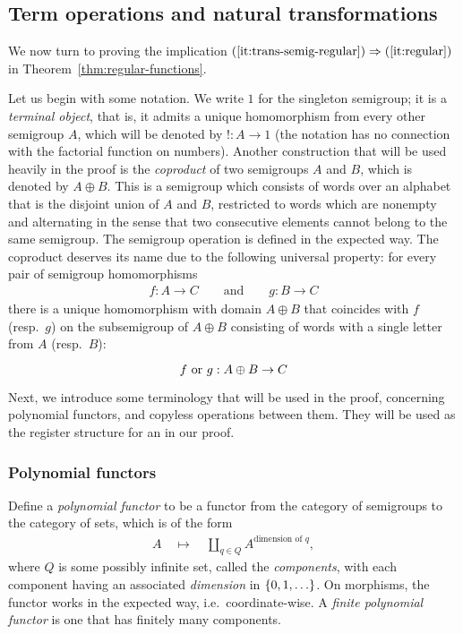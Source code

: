 

\subsection{Term operations and natural transformations}
We now turn to proving the implication $(\ref{it:trans-semig-regular}) \Rightarrow (\ref{it:regular})$ in Theorem~\ref{thm:regular-functions}.

Let us begin with some notation. We write $1$ for the singleton semigroup; it is a \emph{terminal object}, that is, it admits a unique homomorphism from every other semigroup $A$, which will be denoted by $! : A \to 1$ (the notation has no connection with the factorial function on numbers). Another construction that will be used heavily in the proof is the \emph{coproduct} of two semigroups $A$ and $B$, which is denoted by $A \oplus B$. This is a semigroup which consists of words over an alphabet that is the disjoint union of $A$ and $B$, restricted to words which are nonempty and alternating in the sense that two consecutive elements cannot belong to the same semigroup. The semigroup operation is defined in the expected way. The coproduct deserves its name due to the following universal property: for every pair of semigroup homomorphisms
\begin{align*}
f : A \to C \qquad \text{and} \qquad g : B \to C
\end{align*}
there is a unique homomorphism with domain $A\oplus B$ that coincides with $f$ (resp.~$g$) on the subsemigroup of $A \oplus B$ consisting of words with a single letter from $A$ (resp.~$B$):
\[
\begin{tikzcd}
f \text{ or } g : A \oplus B \to C
\end{tikzcd}
\]
Next, we introduce some terminology that will be used in the proof, concerning  polynomial functors, and copyless operations between them. They will be used as the register structure for an \sst in our proof. 

\subsubsection{Polynomial functors}
Define a \emph{polynomial functor} to be a functor from the category of semigroups to the category of sets, which is of the form
\begin{align*}
A \quad \mapsto \quad \coprod_{q \in Q} A^{\text{dimension of } q},
\end{align*}
where $Q$ is some possibly infinite set, called the \emph{components}, with each  component having an associated \emph{dimension} in $\{0,1,\ldots\}$. On morphisms, the functor works in the expected way, i.e.~coordinate-wise.  A \emph{finite polynomial functor} is one that has finitely many components. 

